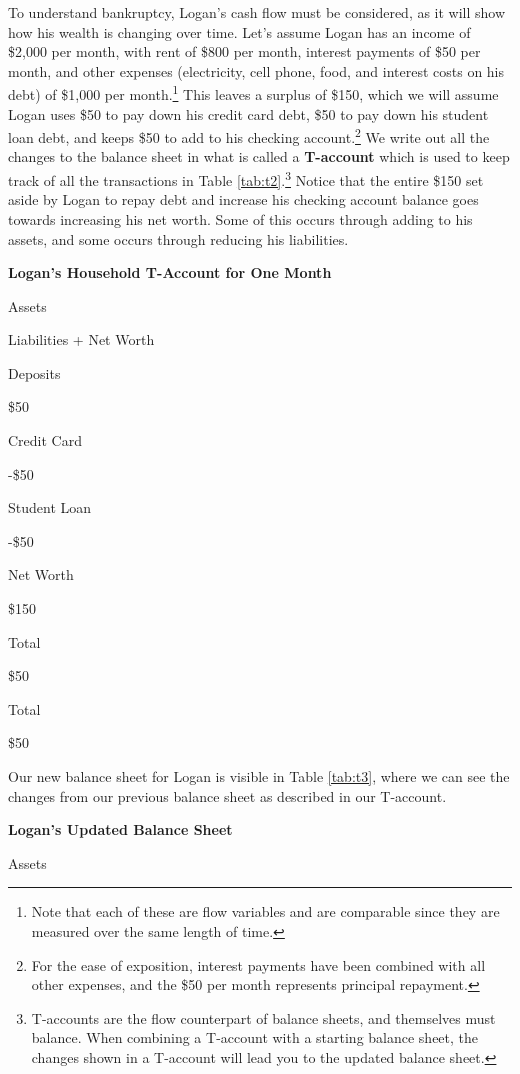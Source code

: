 \documentclass[
]{book}
\begin{document}
To understand bankruptcy, Logan's cash flow must be considered, as it will show how his wealth is changing over time. Let's assume Logan has an income of \$2,000 per month, with rent of \$800 per month, interest payments of \$50 per month, and other expenses (electricity, cell phone, food, and interest costs on his debt) of \$1,000 per month.\footnote{Note that each of these are flow variables and are comparable since they are measured over the same length of time.} This leaves a surplus of \$150, which we will assume Logan uses \$50 to pay down his credit card debt, \$50 to pay down his student loan debt, and keeps \$50 to add to his checking account.\footnote{For the ease of exposition, interest payments have been combined with all other expenses, and the \$50 per month represents principal repayment.} We write out all the changes to the balance sheet in what is called a \textbf{T-account} which is used to keep track of all the transactions in Table \ref{tab:t2}.\footnote{T-accounts are the flow counterpart of balance sheets, and themselves must balance. When combining a T-account with a starting balance sheet, the changes shown in a T-account will lead you to the updated balance sheet.} Notice that the entire \$150 set aside by Logan to repay debt and increase his checking account balance goes towards increasing his net worth. Some of this occurs through adding to his assets, and some occurs through reducing his liabilities.

\label{tab:t2}\textbf{Logan's Household T-Account for One Month}

Assets

Liabilities + Net Worth

Deposits

\$50

Credit Card

-\$50

Student Loan

-\$50

Net Worth

\$150

Total

\$50

Total

\$50

Our new balance sheet for Logan is visible in Table \ref{tab:t3}, where we can see the changes from our previous balance sheet as described in our T-account.

\label{tab:t3}\textbf{Logan's Updated Balance Sheet}

Assets
\end{document}
